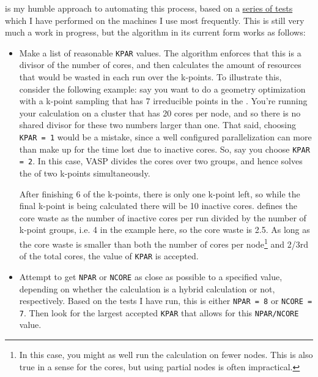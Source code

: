 \begin{refsection}
 is my humble approach to automating this 
process, based on a 
\href{https://mybinder.org/v2/gh/mbercx/jupyter/master?filepath=parallel\%2Fparallel_analysis.ipynb}{series 
of tests} which I have performed on the machines I use most frequently. This 
is still very much a work in progress, but the algorithm in its current form 
works as follows: 
 
\begin{itemize} 
 
\item Make a list of reasonable \texttt{KPAR} values. The algorithm enforces 
that this is a divisor of the number of cores, and then calculates the amount 
of resources that would be wasted in each run over the k-points. To illustrate 
this, consider the following example: say you want to do a geometry 
optimization with a k-point sampling that has 7 irreducible points in the 
. You're running your calculation on a cluster that 
has 20 cores per node, and so there is no shared divisor for these two 
numbers larger than one. That said, choosing \texttt{KPAR = 1} would be a mistake, since a 
well configured parallelization can more than make up for the time lost due to inactive 
cores. So, say you choose \texttt{KPAR = 2}. In this case, VASP 
divides the cores over two groups, and hence solves the  of two k-points simultaneously. 

After finishing 6 of the k-points, there is only one k-point left, so while 
the final k-point is being calculated there will be 10 inactive cores. 
 defines the core waste as the number of 
inactive cores per run divided by the number of k-point groups, i.e. 4 in the 
example here, so the core waste is 2.5. As long as the core waste is smaller 
than both the number of cores per node\footnote{In this case, you might as 
well run the calculation on fewer nodes. This is also true in a sense for the 
cores, but using partial nodes is often impractical.} and 2/3rd of the total 
cores, the value of \texttt{KPAR} is accepted. 
 
\item Attempt to get \texttt{NPAR} or \texttt{NCORE} as close as possible to a 
specified value, depending on whether the calculation is a hybrid calculation 
or not, respectively. Based on the tests I have run, this is either 
\texttt{NPAR = 8} or \texttt{NCORE = 7}. Then look for the largest accepted 
\texttt{KPAR} that allows for this \texttt{NPAR/NCORE} value. 
 

\end{itemize}
\end{refsection}
